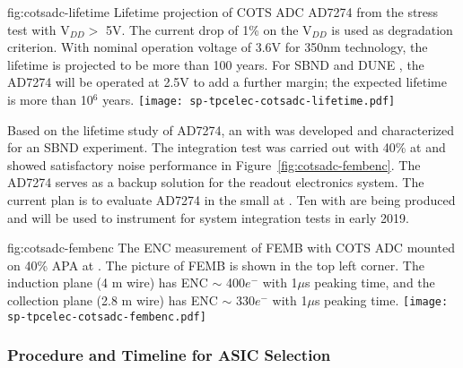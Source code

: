 \begin{dunefigure}
{fig:cotsadc-lifetime}
	{Lifetime projection of COTS ADC AD7274 from the stress test with V$_{DD} >$ 5V. The current drop of 1\% on the V$_{DD}$ is used as degradation criterion. With nominal operation voltage of 3.6V for 350nm  technology, the lifetime is projected to be more than 100 years. For SBND and DUNE , the AD7274 will be operated at 2.5V to add a further margin; the expected lifetime is more than 10$^6$ years.}
\texttt{[image: sp-tpcelec-cotsadc-lifetime.pdf]}
\end{dunefigure}

Based on the lifetime study of AD7274, an  with   was developed and characterized for an SBND experiment. The integration test was carried out with 40\%  at  and showed satisfactory noise performance in Figure~\ref{fig:cotsadc-fembenc}. The   AD7274 serves as a backup solution for the    readout electronics system. The current plan is to evaluate AD7274  in the small   at . Ten  with   are being produced and will be used to instrument   for system integration tests in early 2019. 

\begin{dunefigure}
{fig:cotsadc-fembenc}
	{The ENC measurement of FEMB with COTS ADC mounted on 40\% APA at . The picture of FEMB is shown in the top left corner. The induction plane (4 m wire) has ENC $\sim$ 400$e^-$ with 1$\mu$s peaking time, and the collection plane (2.8 m wire) has ENC $\sim$ 330$e^-$ with 1$\mu$s peaking time.}
\texttt{[image: sp-tpcelec-cotsadc-fembenc.pdf]}
\end{dunefigure}

\subsubsection{Procedure and Timeline for ASIC Selection}
\label{sec:fdsp-tpcelec-design-femb-selection}

